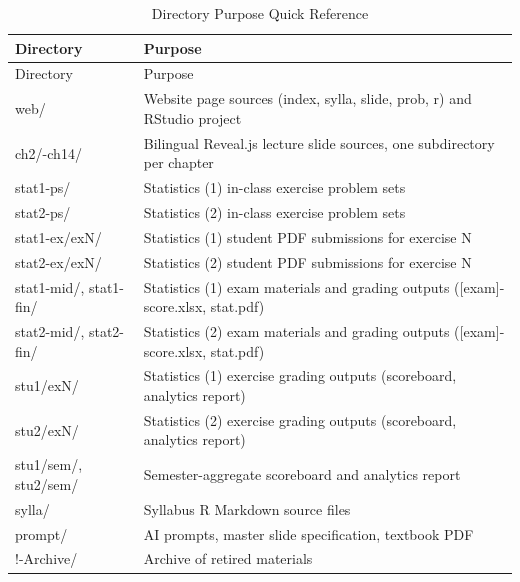 \documentclass[
]{article}
\begin{document}
\begin{longtable}[]{@{}
  >{\raggedright\arraybackslash}p{}
  >{\raggedright\arraybackslash}p{}@{}}
\caption{Directory Purpose Quick Reference}\tabularnewline
\toprule\noalign{}
\begin{minipage}[b]{\linewidth}\raggedright
Directory
\end{minipage} & \begin{minipage}[b]{\linewidth}\raggedright
Purpose
\end{minipage} \\
\midrule\noalign{}
\endfirsthead
\toprule\noalign{}
\begin{minipage}[b]{\linewidth}\raggedright
Directory
\end{minipage} & \begin{minipage}[b]{\linewidth}\raggedright
Purpose
\end{minipage} \\
\midrule\noalign{}
\endhead
\bottomrule\noalign{}
\endlastfoot
web/ & Website page sources (index, sylla, slide, prob, r) and RStudio
project \\
ch2/-ch14/ & Bilingual Reveal.js lecture slide sources, one subdirectory
per chapter \\
stat1-ps/ & Statistics (1) in-class exercise problem sets \\
stat2-ps/ & Statistics (2) in-class exercise problem sets \\
stat1-ex/exN/ & Statistics (1) student PDF submissions for exercise N \\
stat2-ex/exN/ & Statistics (2) student PDF submissions for exercise N \\
stat1-mid/, stat1-fin/ & Statistics (1) exam materials and grading
outputs ({[}exam{]}-score.xlsx, stat.pdf) \\
stat2-mid/, stat2-fin/ & Statistics (2) exam materials and grading
outputs ({[}exam{]}-score.xlsx, stat.pdf) \\
stu1/exN/ & Statistics (1) exercise grading outputs (scoreboard,
analytics report) \\
stu2/exN/ & Statistics (2) exercise grading outputs (scoreboard,
analytics report) \\
stu1/sem/, stu2/sem/ & Semester-aggregate scoreboard and analytics
report \\
sylla/ & Syllabus R Markdown source files \\
prompt/ & AI prompts, master slide specification, textbook PDF \\
!-Archive/ & Archive of retired materials \\
\end{longtable}
\end{document}
